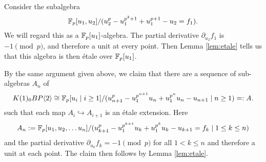 \begin{ex}
	Consider the subalgebra
	\[
	\mathbb{F}_p[u_1,u_2]/(u_2^p-u_1^{p^2+1}+u_1^{p+1}-u_2=f_1).
	\]
	We will regard this as a $\mathbb{F}_p[u_1]$-algebra. The partial derivative $\partial_{u_2}f_1$ is $-1\pmod{p}$, and therefore a unit at every point. Then Lemma \ref{lem:etale} tells us that this algebra is then \'etale over $\mathbb{F}_p[u_1]$.
\end{ex} 

By the same argument given above, we claim that there are a sequence of sub-algebras $A_n$ of 
	\[
	K(1)_0 BP\langle 2 \rangle\cong\mathbb{F}_p[u_i\mid i\geq 1]/(u_{n+1}^p-u_1^{p^{n+1}}u_n+u_1^{p^n}u_n-u_{n+1}\mid n\geq 1)=:A.
	\]
such that each map $A_i\hookrightarrow A_{i+1}$ is an \'etale extension. Here 
\[A_n:=\mathbb{F}_p[u_1,u_2,\ldots u_n]/(u_{k+1}^p-u_1^{p^{k+1}}u_k+u_1^{p^k}u_k-u_{k+1} =f_{k} \mid 1\le k\le n)\]
and the partial derivative $\partial_{u_k}f_{k}=-1\pmod{p}$ for all $1<k\le n$ and therefore a unit at each point. The claim then follows by Lemma \ref{lem:etale}.

